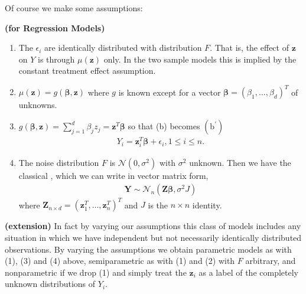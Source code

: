\documentclass{article}
\newcommand{\bfs}[1]{\textbf{({#1}) }}
\begin{document}
Of course we make some assumptions:
\begin{assuma}\bfs{for Regression Models}

\begin{enumerate}[(1).]
    \item {} The $\epsilon_{i}$ are identically distributed with distribution $F$. That is, the effect of $\mathbf{z}$ on $Y$ is through $\mu(\mathbf{z})$ only. In the two sample models this is implied by the constant treatment effect assumption. 
    \item {} $\mu(\mathbf{z})=g(\boldsymbol{\beta}, \mathbf{z})$ where $g$ is known except for a vector $\boldsymbol{\beta}=\left(\beta_{1}, \ldots, \beta_{d}\right)^{T}$ of unknowns. 
    \item {} $g(\boldsymbol{\beta}, \mathbf{z})=\sum_{j=1}^{d} \beta_{j} z_{j}=\mathbf{z}^{T} \boldsymbol{\beta}$ so that (b) becomes
$\left(\mathrm{b}^{\prime}\right)$
\begin{align*}
Y_{i}=\mathbf{z}_{i}^{T} \boldsymbol{\beta}+\epsilon_{i}, 1 \leq i \leq n .
\end{align*}
\item {}  
The noise distribution $F$ is $\mathcal{N}\left(0, \sigma^{2}\right)$ with $\sigma^{2}$ unknown. Then we have the classical , which we can write in vector matrix form,
\begin{align*}
\mathbf{Y} \sim \mathcal{N}_{n}\left(\mathbf{Z} \boldsymbol{\beta}, \sigma^{2} J\right)
\end{align*}
where $\mathbf{Z}_{n \times d}=\left(\mathbf{z}_{1}^{T}, \ldots, \mathbf{z}_{n}^{T}\right)^{T}$ and $J$ is the $n \times n$ identity.

\end{enumerate}
\end{assuma}
\begin{rema}\bfs{extension}
In fact by varying our assumptions this class of models includes any situation in which we have independent but not necessarily identically distributed observations. By varying the assumptions we obtain parametric models as with (1), (3) and (4) above, semiparametric as with (1) and (2) with $F$ arbitrary, and nonparametric if we drop (1) and simply treat the $\mathbf{z}_{i}$ as a label of the completely unknown distributions of $Y_{i}$. 
\end{rema}
\end{document}
